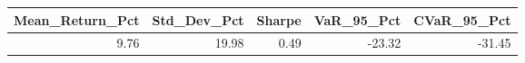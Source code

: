 \begin{tabular}{rrrrr}
\toprule
Mean_Return_Pct & Std_Dev_Pct & Sharpe & VaR_95_Pct & CVaR_95_Pct \\
\midrule
9.76 & 19.98 & 0.49 & -23.32 & -31.45 \\
\bottomrule
\end{tabular}
